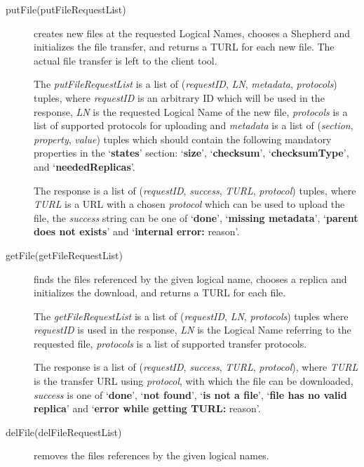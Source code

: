 \documentclass{book}
\begin{document}
\begin{description}

    \item[putFile(putFileRequestList)] creates new files at the requested Logical Names, chooses a Shepherd and initializes the file transfer, and returns a TURL for each new file. The actual file transfer is left to the client tool.
        
    The \emph{putFileRequestList} is a list of (\emph{requestID}, \emph{LN}, \emph{metadata}, \emph{protocols}) tuples, where \emph{requestID} is an arbitrary ID which will be used in the response, \emph{LN} is the requested Logical Name of the new file, \emph{protocols} is a list of supported protocols for uploading and \emph{metadata} is a list of (\emph{section}, \emph{property}, \emph{value}) tuples which should contain the following mandatory properties in the `\textbf{states}' section: `\textbf{size}', `\textbf{checksum}', `\textbf{checksumType}', and  `\textbf{neededReplicas}'. 

    The response is a list of (\emph{requestID}, \emph{success}, \emph{TURL}, \emph{protocol}) tuples, where \emph{TURL} is a URL with a chosen \emph{protocol} which can be used to upload the file, the \emph{success} string can be one of `\textbf{done}', `\textbf{missing metadata}', `\textbf{parent does not exists}' and `\textbf{internal error:} reason'.

    \item[getFile(getFileRequestList)] finds the files referenced by the given logical name, chooses a replica and initializes the download, and returns a TURL for each file.
    
    The \emph{getFileRequestList} is a list of (\emph{requestID}, \emph{LN}, \emph{protocols}) tuples where \emph{requestID} is used in the response, \emph{LN} is the Logical Name referring to the requested file, \emph{protocols} is a list of supported transfer protocols.
    
    The response is a list of (\emph{requestID}, \emph{success}, \emph{TURL}, \emph{protocol}), where \emph{TURL} is the transfer URL using \emph{protocol}, with which the file can be downloaded, \emph{success} is one of `\textbf{done}', `\textbf{not found}', `\textbf{is not a file}', `\textbf{file has no valid replica}' and `\textbf{error while getting TURL:} reason'.

    \item[delFile(delFileRequestList)] removes the files references by the given logical names.


\end{description}
\end{document}
